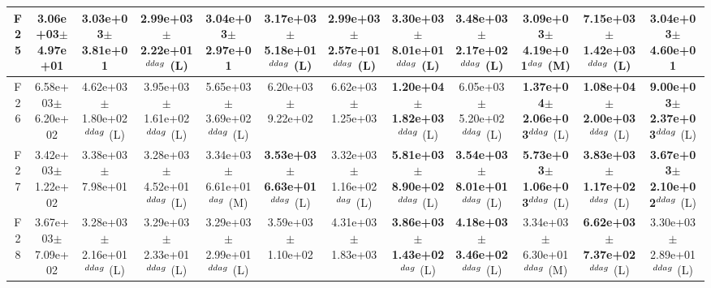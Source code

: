 \begin{table}[!t]
\begin{tabular}{c|ccccccccccc}
F25  & 3.06e+03$\pm$4.97e+01  & 3.03e+03$\pm$3.81e+01   & 2.99e+03$\pm$2.22e+01$^{\\ddag}$ (L)  & 3.04e+03$\pm$2.97e+01   & \textbf{3.17e+03$\pm$5.18e+01}$^{\\ddag}$ (L)  & 2.99e+03$\pm$2.57e+01$^{\\ddag}$ (L)  & \textbf{3.30e+03$\pm$8.01e+01}$^{\\ddag}$ (L)  & \textbf{3.48e+03$\pm$2.17e+02}$^{\\ddag}$ (L)  & \textbf{3.09e+03$\pm$4.19e+01}$^{\\dag}$ (M)  & \textbf{7.15e+03$\pm$1.42e+03}$^{\\ddag}$ (L)  & 3.04e+03$\pm$4.60e+01  \\ \hline
F26  & 6.58e+03$\pm$6.20e+02  & 4.62e+03$\pm$1.80e+02$^{\\ddag}$ (L)  & 3.95e+03$\pm$1.61e+02$^{\\ddag}$ (L)  & 5.65e+03$\pm$3.69e+02$^{\\ddag}$ (L)  & 6.20e+03$\pm$9.22e+02   & 6.62e+03$\pm$1.25e+03   & \textbf{1.20e+04$\pm$1.82e+03}$^{\\ddag}$ (L)  & 6.05e+03$\pm$5.20e+02$^{\\ddag}$ (L)  & \textbf{1.37e+04$\pm$2.06e+03}$^{\\ddag}$ (L)  & \textbf{1.08e+04$\pm$2.00e+03}$^{\\ddag}$ (L)  & \textbf{9.00e+03$\pm$2.37e+03}$^{\\ddag}$ (L) \\ \hline
F27  & 3.42e+03$\pm$1.22e+02  & 3.38e+03$\pm$7.98e+01   & 3.28e+03$\pm$4.52e+01$^{\\ddag}$ (L)  & 3.34e+03$\pm$6.61e+01$^{\\dag}$ (M)  & \textbf{3.53e+03$\pm$6.63e+01}$^{\\ddag}$ (L)  & 3.32e+03$\pm$1.16e+02$^{\\dag}$ (L)  & \textbf{5.81e+03$\pm$8.90e+02}$^{\\ddag}$ (L)  & \textbf{3.54e+03$\pm$8.01e+01}$^{\\ddag}$ (L)  & \textbf{5.73e+03$\pm$1.06e+03}$^{\\ddag}$ (L)  & \textbf{3.83e+03$\pm$1.17e+02}$^{\\ddag}$ (L)  & \textbf{3.67e+03$\pm$2.10e+02}$^{\\ddag}$ (L) \\ \hline
F28  & 3.67e+03$\pm$7.09e+02  & 3.28e+03$\pm$2.16e+01$^{\\ddag}$ (L)  & 3.29e+03$\pm$2.33e+01$^{\\ddag}$ (L)  & 3.29e+03$\pm$2.99e+01$^{\\ddag}$ (L)  & 3.59e+03$\pm$1.10e+02   & 4.31e+03$\pm$1.83e+03   & \textbf{3.86e+03$\pm$1.43e+02}$^{\\dag}$ (L)  & \textbf{4.18e+03$\pm$3.46e+02}$^{\\ddag}$ (L)  & 3.34e+03$\pm$6.30e+01$^{\\ddag}$ (M)  & \textbf{6.62e+03$\pm$7.37e+02}$^{\\ddag}$ (L)  & 3.30e+03$\pm$2.89e+01$^{\\ddag}$ (L) \\ \hline

\end{tabular}
\end{table}
